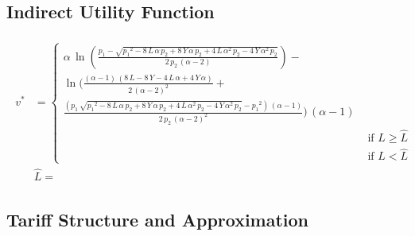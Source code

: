 \documentclass[12pt]{article}
\begin{document}
\subsection{Indirect Utility Function}\label{appendix:indirectutil}

\begin{align}\label{eq:vstar}
\begin{split}
v^{*} &= 
\begin{cases}
\alpha \,\ln(\frac{p_{1}-\sqrt{{p_{1}}^2-8\,L\,\alpha \,p_{2}+8\,Y\,\alpha \,p_{2}+4\,L\,\alpha ^2\,p_{2}-4\,Y\,\alpha ^2\,p_{2}}}{2\,p_{2}\,(\alpha -2)})- \\ \ln(\frac{(\alpha -1)\,(8\,L-8\,Y-4\,L\,\alpha +4\,Y\,\alpha )}{2\,{(\alpha -2)}^2}+ \\
\frac{(p_{1}\,\sqrt{{p_{1}}^2-8\,L\,\alpha \,p_{2}+8\,Y\,\alpha \,p_{2}+4\,L\,\alpha ^2\,p_{2}-4\,Y\,\alpha ^2\,p_{2}}-{p_{1}}^2)\,(\alpha -1)}{2\,p_{2}\,{(\alpha -2)}^2})\,(\alpha -1)\\
 &\text{ if } L \geq \widehat{L} \\
 &\text{ if } L < \widehat{L}
\end{cases} \\
&\widehat{L} = 
\end{split}
\end{align}



\subsection{Tariff Structure and Approximation}\label{appendix:tariff}

\end{document}
